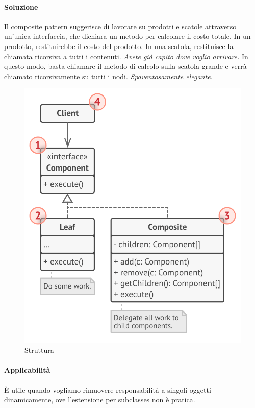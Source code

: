 \documentclass[11pt]{article}
\begin{document}
\paragraph{Soluzione}
Il composite pattern suggerisce di lavorare su prodotti e scatole attraverso un'unica interfaccia, che dichiara un metodo per calcolare il costo totale. In un prodotto, restituirebbe il costo del prodotto. In una scatola, restituisce la chiamata ricorsiva a tutti i contenuti. \textit{Avete già capito dove voglio arrivare.} In questo modo, basta chiamare il metodo di calcolo sulla scatola grande e verrà chiamato ricorsivamente su tutti i nodi. \textit{Spaventosamente elegante.}
\begin{figure}[H]
    \centering
    \includegraphics[width=\linewidth]{res/teoria/Composite.png}
    \caption{Struttura}
\end{figure}
\paragraph{Applicabilità}
È utile quando vogliamo rimuovere responsabilità a singoli oggetti dinamicamente, ove l'estensione per subclasses non è pratica.
\end{document}
